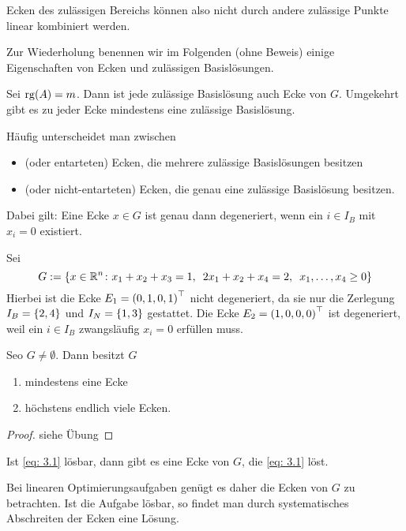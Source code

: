 Ecken des zulässigen Bereichs können also nicht durch andere zulässige Punkte linear kombiniert werden.

Zur Wiederholung benennen wir im Folgenden (ohne Beweis) einige Eigenschaften von Ecken und zulässigen Basislösungen.

\begin{satz} %
	Sei $\operatorname{rg}(A) = m$. Dann ist jede zulässige Basislösung auch Ecke von $G$. Umgekehrt gibt es zu jeder Ecke mindestens eine zulässige Basislösung.
\end{satz}

Häufig unterscheidet man zwischen 
\begin{itemize}[nolistsep, topsep=-\parskip]
	\item {} (oder entarteten) Ecken, die mehrere zulässige Basislösungen besitzen
	\item {} (oder nicht-entarteten) Ecken, die genau eine zulässige Basislösung besitzen.
\end{itemize}
Dabei gilt: Eine Ecke $x \in G$ ist genau dann degeneriert, wenn ein $i \in I_B$ mit $x_i=0$ existiert.

\begin{beispiel} %
	Sei
	\begin{equation*}
		G \mathrel{:=} \left\{ x \in \mathbb{R}^n \colon x_1+x_2+x_3=1, \enskip 2x_1+x_2+x_4=2, \enskip x_1,\dots , x_4 \ge 0 \right\}
	\end{equation*}
	Hierbei ist die Ecke $E_1 = \left( 0,1,0,1 \right)^{\top}$ nicht degeneriert, da sie nur die Zerlegung $I_B = \left\{ 2,4 \right\}$ und $I_N = \left\{ 1,3 \right\}$ gestattet.
	Die Ecke $E_2 = \left( 1,0,0,0 \right)^{\top}$ ist degeneriert, weil ein $i \in I_B$ zwangsläufig $x_i = 0$ erfüllen muss.
\end{beispiel}

\begin{satz} %
	Seo $G \neq \emptyset$. Dann besitzt $G$
	\begin{enumerate}[nolistsep, topsep=-\parskip]
		\item mindestens eine Ecke
		\item höchstens endlich viele Ecken.
	\end{enumerate}
\end{satz}
\begin{proof}
	siehe Übung
\end{proof}

\begin{satz} %
	Ist \eqref{eq: 3.1} lösbar, dann gibt es eine Ecke von $G$, die \eqref{eq: 3.1} löst.
\end{satz}

Bei linearen Optimierungsaufgaben genügt es daher die Ecken von $G$ zu betrachten. Ist die Aufgabe lösbar, so findet man durch systematisches Abschreiten der Ecken eine Lösung.